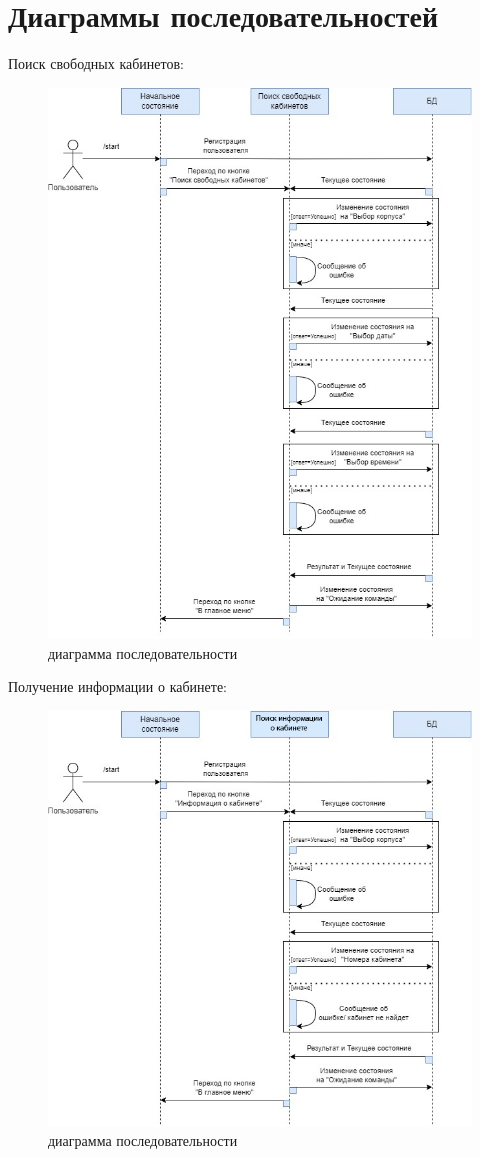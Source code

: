 \chapter{Диаграммы последовательностей}

Поиск свободных кабинетов:
\begin{figure}[h]
    \centering
    \includegraphics[scale=0.6]{img/seq1}
    \caption{диаграмма последовательности}
    \label{fig:cp}
\end{figure}

Получение информации о кабинете:
\begin{figure}[h]
    \centering
    \includegraphics[scale=0.6]{img/seq2}
    \caption{диаграмма последовательности}
    \label{fig:cp}
\end{figure}